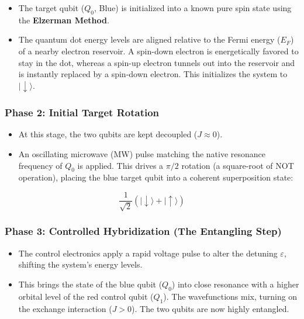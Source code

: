 \documentclass[
]{article}
\providecommand{\tightlist}{%
  \setlength{\itemsep}{0pt}\setlength{\parskip}{0pt}}
\begin{document}
\begin{itemize}
\tightlist
\item
  The target qubit (\(Q_0\), Blue) is initialized into a known pure spin
  state using the \textbf{Elzerman Method}.
\item
  The quantum dot energy levels are aligned relative to the Fermi energy
  (\(E_F\)) of a nearby electron reservoir. A spin-down electron is
  energetically favored to stay in the dot, whereas a spin-up electron
  tunnels out into the reservoir and is instantly replaced by a
  spin-down electron. This initializes the system to
  \(|\downarrow\rangle\).
\end{itemize}

\subsubsection{Phase 2: Initial Target
Rotation}\label{phase-2-initial-target-rotation}

\begin{itemize}
\tightlist
\item
  At this stage, the two qubits are kept decoupled (\(J \approx 0\)).
\item
  An oscillating microwave (MW) pulse matching the native resonance
  frequency of \(Q_0\) is applied. This drives a \(\pi/2\) rotation (a
  square-root of NOT operation), placing the blue target qubit into a
  coherent superposition state:
\end{itemize}

\[\frac{1}{\sqrt{2}}(|\downarrow\rangle + |\uparrow\rangle)\]

\subsubsection{Phase 3: Controlled Hybridization (The Entangling
Step)}\label{phase-3-controlled-hybridization-the-entangling-step}

\begin{itemize}
\tightlist
\item
  The control electronics apply a rapid voltage pulse to alter the
  detuning \(\varepsilon\), shifting the system's energy levels.
\item
  This brings the state of the blue qubit (\(Q_0\)) into close resonance
  with a higher orbital level of the red control qubit (\(Q_1\)). The
  wavefunctions mix, turning on the exchange interaction (\(J > 0\)).
  The two qubits are now highly entangled.
\end{itemize}
\end{document}
